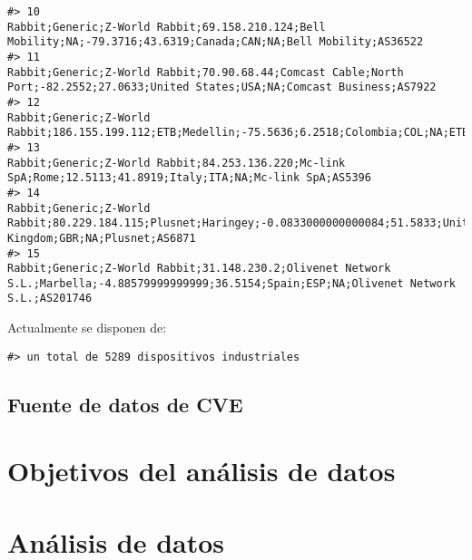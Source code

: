 \documentclass[]{article}
\begin{document}
\begin{verbatim}
#> 10                                                                                                                                             Rabbit;Generic;Z-World Rabbit;69.158.210.124;Bell Mobility;NA;-79.3716;43.6319;Canada;CAN;NA;Bell Mobility;AS36522
#> 11                                                                                                                               Rabbit;Generic;Z-World Rabbit;70.90.68.44;Comcast Cable;North Port;-82.2552;27.0633;United States;USA;NA;Comcast Business;AS7922
#> 12                                                                                                                                                         Rabbit;Generic;Z-World Rabbit;186.155.199.112;ETB;Medellin;-75.5636;6.2518;Colombia;COL;NA;ETB;AS19429
#> 13                                                                                                                                                  Rabbit;Generic;Z-World Rabbit;84.253.136.220;Mc-link SpA;Rome;12.5113;41.8919;Italy;ITA;NA;Mc-link SpA;AS5396
#> 14                                                                                                                                 Rabbit;Generic;Z-World Rabbit;80.229.184.115;Plusnet;Haringey;-0.0833000000000084;51.5833;United Kingdom;GBR;NA;Plusnet;AS6871
#> 15                                                                                                                Rabbit;Generic;Z-World Rabbit;31.148.230.2;Olivenet Network S.L.;Marbella;-4.88579999999999;36.5154;Spain;ESP;NA;Olivenet Network S.L.;AS201746
\end{verbatim}

Actualmente se disponen de:

\begin{verbatim}
#> un total de 5289 dispositivos industriales
\end{verbatim}

\subsection{Fuente de datos de CVE}\label{fuente-de-datos-de-cve}

\section{Objetivos del análisis de
datos}\label{objetivos-del-analisis-de-datos}

\section{Análisis de datos}\label{analisis-de-datos}
\end{document}
